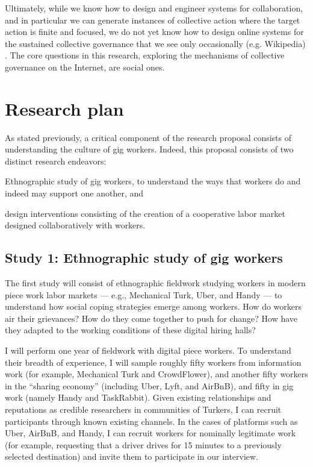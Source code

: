 \documentclass{article}
\begin{document}
Ultimately, while we know how to design and engineer systems for collaboration,
and in particular we can generate instances of collective action where the target action is finite and focused,
we do not yet know how to design online systems for the sustained collective governance that we see only occasionally
(e.g. Wikipedia)
\citep{catalyst,dynamo,foundry}.
The core questions in this research, exploring the mechanisms of collective governance on the Internet, are social ones.

\section*{Research plan}
As stated previously,
a critical component of the research proposal consists of
understanding the culture of gig workers.
Indeed, this proposal consists of two distinct research endeavors:
\begin{inlinelist}
\item Ethnographic study of gig workers, to understand the ways that workers do and indeed may support one another, and
\item design interventions consisting of the creation of a cooperative labor market designed collaboratively with workers.
\end{inlinelist}

\subsection*{Study 1: Ethnographic study of gig workers}
The first study will consist of ethnographic fieldwork studying workers in modern piece work labor markets 
--- e.g., Mechanical Turk, Uber, and Handy ---
to understand how social coping strategies emerge among workers.
How do workers air their grievances?
How do they come together to push for change?
How have they adapted to the working conditions of these digital hiring halls?

I will perform one year of fieldwork with digital piece workers.
To understand their breadth of experience, I will sample roughly fifty workers from information work
(for example,
Mechanical Turk and CrowdFlower),
and another fifty workers in the ``sharing economy''
(including Uber,
Lyft,
and AirBnB),
and fifty in gig work
(namely Handy and TaskRabbit).
Given existing relationships and reputations as credible researchers in communities of Turkers, I can recruit participants through known existing channels.
In the cases of platforms such as Uber,
AirBnB,
and Handy, I can recruit workers for nominally legitimate work
(for example,
requesting that a driver drives for 15 minutes to a previously selected destination)
and invite them to participate in our interview.
\end{document}
